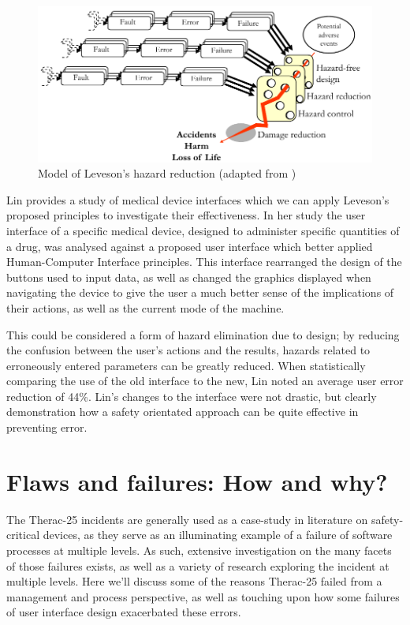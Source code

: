 \documentclass{cshonours}
\newcommand{\ther}{Therac-25\xspace}
\begin{document}
\begin{figure}
 \includegraphics[width=\textwidth]{figs/besnardmodified.pdf}
 \caption{Model of Leveson's hazard reduction (adapted from \cite[fig.~6]{besnard2003human})}
 \label{fig:besnardmodel}
\end{figure}

Lin \cite{lin2001patient} provides a study of medical device interfaces which we can apply Leveson's proposed principles to investigate their effectiveness. In her study the user interface of a specific medical device, designed to administer specific quantities of a drug, was analysed against a proposed user interface which better applied Human-Computer Interface principles. This interface rearranged the design of the buttons used to input data, as well as changed the graphics displayed when navigating the device to give the user a much better sense of the implications of their actions, as well as the current mode of the machine.

This could be considered a form of hazard elimination due to design; by reducing the confusion between the user's actions and the results, hazards related to erroneously entered parameters can be greatly reduced. When statistically comparing the use of the old interface to the new, Lin noted an average user error reduction of 44\%. Lin's changes to the interface were not drastic, but clearly demonstration how a safety orientated approach can be quite effective in preventing error.


\chapter{Flaws and failures: How and why?}
\label{chap:flawsfailures}
The \ther incidents are generally used as a case-study in literature on safety-critical devices, as they serve as an illuminating example of a failure of software processes at multiple levels. As such, extensive investigation on the many facets of those failures exists, as well as a variety of research exploring the incident at multiple levels. Here we'll discuss some of the reasons \ther failed from a management and process perspective, as well as touching upon how some failures of user interface design exacerbated these errors.
\end{document}
